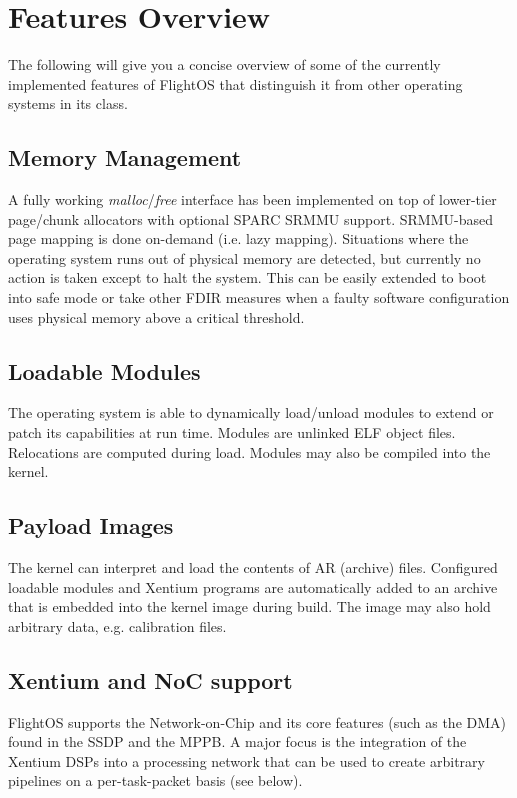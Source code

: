 \section {Features Overview}

The following will give you a concise overview of some of the currently 
implemented features of FlightOS that distinguish it from other operating
systems in its class.

\subsection {Memory Management}

A fully working \emph{malloc}/\emph{free} interface has been implemented on top
of lower-tier page/chunk allocators with optional SPARC SRMMU support.
SRMMU-based page mapping is done on-demand (i.e. lazy mapping). Situations
where the operating system runs out of physical memory are detected, but
currently no action is taken except to halt the system. This can be easily
extended to boot into safe mode or take other FDIR measures when a faulty
software configuration uses physical memory above a critical threshold.

\subsection {Loadable Modules}

The operating system is able to dynamically load/unload modules to extend
or patch its capabilities at run time. Modules are unlinked ELF object files.
Relocations are computed during load. Modules may also be compiled into the
kernel.

\subsection {Payload Images}

The kernel can interpret and load the contents of AR (archive) files. Configured
loadable modules and Xentium programs are automatically added to an archive
that is embedded into the kernel image during build. The image may also hold
arbitrary data, e.g. calibration files.


\subsection {Xentium and NoC support}

FlightOS supports the Network-on-Chip and its core features (such as the DMA)
found in the \gls{SSDP} and the \gls{MPPB}. A major focus is the integration
of the \gls{Xentium} \glspl{DSP} into a processing network that can be used to
create arbitrary pipelines on a per-task-packet basis (see below).

